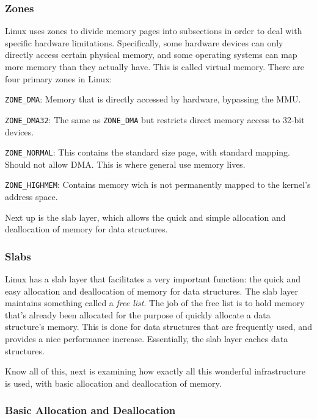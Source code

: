\documentclass[10pt,letterpaper,onecolumn,draftclsnofoot]{IEEEtran}
\begin{document}
\subsubsection{Zones}
Linux uses zones to divide memory pages into subsections in order to
deal with specific hardware limitations. Specifically, some hardware
devices can only directly access certain physical memory, and some
operating systems can map more memory than they actually have. This is
called virtual memory. There are four primary zones in Linux:
\begin{description}
	\item \texttt{ZONE\_DMA}: Memory that is directly accessed by
	hardware, bypassing the MMU.
	\item \texttt{ZONE\_DMA32}: The same as \texttt{ZONE\_DMA} but
	restricts direct memory access to 32-bit devices.
	\item \texttt{ZONE\_NORMAL}: This contains the standard size
	page, with standard mapping. Should not allow DMA. This
	is where general use memory lives.
	\item \texttt{ZONE\_HIGHMEM}: Contains memory wich is not
	permanently mapped to the kernel's address space.
\end{description}
\cite{robertlove2010}
Next up is the slab layer, which allows the quick and simple allocation
and deallocation of memory for data structures.
\subsubsection{Slabs}
Linux has a slab layer that facilitates a very important function: the
quick and easy allocation and deallocation of memory for data
structures. The slab layer maintains something called a \textit{free list}.
The job of the free list is to hold memory that's already been allocated
for the purpose of quickly allocate a data structure's memory. This is
done for data structures that are frequently used, and provides a nice
performance increase. Essentially, the slab layer caches data structures.
\cite{robertlove2010}

Know all of this, next is examining how exactly all this wonderful
infrastructure is used, with basic allocation and deallocation of memory.

\subsubsection{Basic Allocation and Deallocation}
\end{document}
